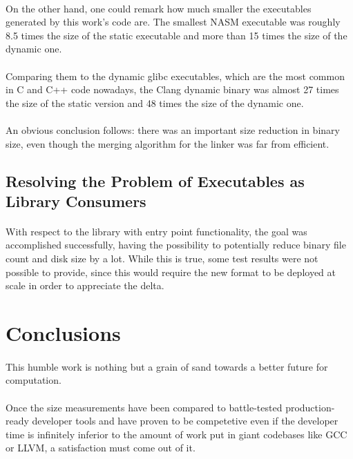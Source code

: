 \documentclass[12pt]{article}
\begin{document}
	\paragraph{}On the other hand, one could remark how much smaller the executables generated by this work's code are. The smallest \acrshort{NASM} executable was roughly 8.5 times the size of the static executable and more than 15 times the size of the dynamic one.
	\paragraph{}Comparing them to the dynamic glibc executables, which are the most common in C and C++ code nowadays, the Clang dynamic binary was almost 27 times the size of the static version and 48 times the size of the dynamic one.
	\paragraph{}An obvious conclusion follows: there was an important size reduction in binary size, even though the merging algorithm for the linker was far from efficient.
	
	\subsection{Resolving the Problem of Executables as Library Consumers}
	\paragraph{}With respect to the library with entry point functionality, the goal was accomplished successfully, having the possibility to potentially reduce binary file count and disk size by a lot. While this is true, some test results were not possible to provide, since this would require the new format to be deployed at scale in order to appreciate the delta.
	
	\newpage
	\section{Conclusions}
	\paragraph{}This humble work is nothing but a grain of sand towards a better future for computation.
	\paragraph{}Once the size measurements have been compared to battle-tested production-ready developer tools and have proven to be competetive even if the developer time is infinitely inferior to the amount of work put in giant codebases like \acrshort{GCC} or \acrshort{LLVM}, a satisfaction must come out of it.
\end{document}
